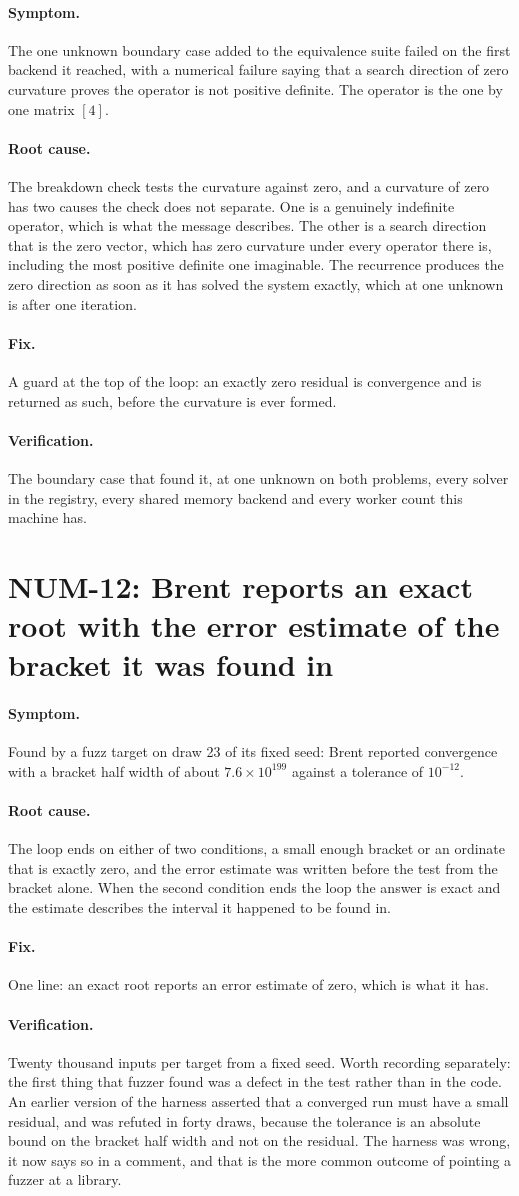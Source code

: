 \documentclass[11pt,a4paper]{report}
\newcommand{\symptom}[1]{\paragraph{Symptom.}#1}
\newcommand{\rootcause}[1]{\paragraph{Root cause.}#1}
\newcommand{\fix}[1]{\paragraph{Fix.}#1}
\newcommand{\verification}[1]{\paragraph{Verification.}#1}
\begin{document}
\symptom{The one unknown boundary case added to the equivalence suite failed on
the first backend it reached, with a numerical failure saying that a search
direction of zero curvature proves the operator is not positive definite. The
operator is the one by one matrix $[4]$.}

\rootcause{The breakdown check tests the curvature against zero, and a curvature
of zero has two causes the check does not separate. One is a genuinely indefinite
operator, which is what the message describes. The other is a search direction
that is the zero vector, which has zero curvature under every operator there is,
including the most positive definite one imaginable. The recurrence produces the
zero direction as soon as it has solved the system exactly, which at one unknown
is after one iteration.}

\fix{A guard at the top of the loop: an exactly zero residual is convergence and
is returned as such, before the curvature is ever formed.}

\verification{The boundary case that found it, at one unknown on both problems,
every solver in the registry, every shared memory backend and every worker count
this machine has.}

\section{NUM-12: Brent reports an exact root with the error estimate of the bracket it was found in}

\symptom{Found by a fuzz target on draw 23 of its fixed seed: Brent reported
convergence with a bracket half width of about $7.6\times10^{199}$ against a
tolerance of $10^{-12}$.}

\rootcause{The loop ends on either of two conditions, a small enough bracket or
an ordinate that is exactly zero, and the error estimate was written before the
test from the bracket alone. When the second condition ends the loop the answer
is exact and the estimate describes the interval it happened to be found in.}

\fix{One line: an exact root reports an error estimate of zero, which is what it
has.}

\verification{Twenty thousand inputs per target from a fixed seed. Worth
recording separately: the first thing that fuzzer found was a defect in the test
rather than in the code. An earlier version of the harness asserted that a
converged run must have a small residual, and was refuted in forty draws, because
the tolerance is an absolute bound on the bracket half width and not on the
residual. The harness was wrong, it now says so in a comment, and that is the
more common outcome of pointing a fuzzer at a library.}
\end{document}
